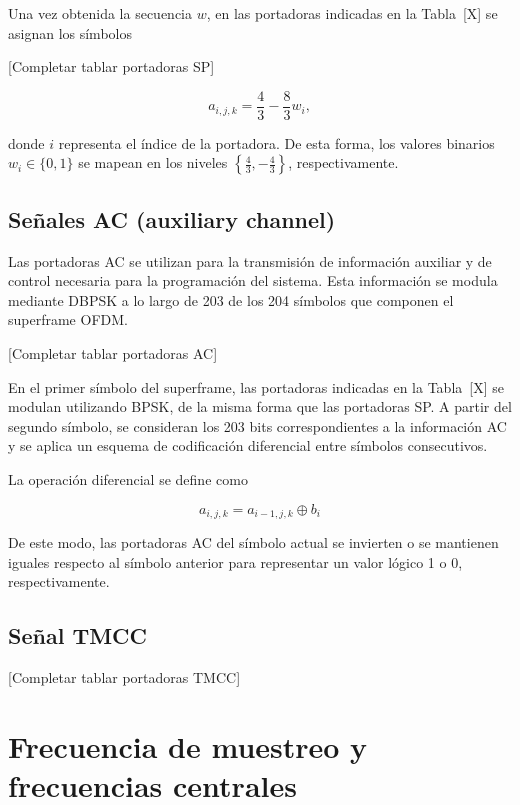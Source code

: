 	Una vez obtenida la secuencia $w$, en las portadoras indicadas en la Tabla~[X] se asignan los símbolos

	{\Huge[Completar tablar portadoras SP]}

	\begin{equation}
		a_{i,j,k} = \frac{4}{3} - \frac{8}{3} w_i,
	\end{equation}

	donde $i$ representa el índice de la portadora. De esta forma, los valores binarios $w_i \in \{0,1\}$ se mapean en los niveles $\left\{ \frac{4}{3}, -\frac{4}{3} \right\}$, respectivamente.


	\subsection{Señales AC (auxiliary channel)}
	Las portadoras AC se utilizan para la transmisión de información auxiliar y de control necesaria para la programación del sistema. Esta información se modula mediante DBPSK a lo largo de 203 de los 204 símbolos que componen el superframe OFDM.

	{\Huge[Completar tablar portadoras AC]}


	En el primer símbolo del superframe, las portadoras indicadas en la Tabla~[X] se modulan utilizando BPSK, de la misma forma que las portadoras SP. A partir del segundo símbolo, se consideran los 203 bits correspondientes a la información AC y se aplica un esquema de codificación diferencial entre símbolos consecutivos.

	La operación diferencial se define como

	\begin{equation}
		a_{i,j,k} = a_{i-1,j,k} \oplus b_i
	\end{equation}

	De este modo, las portadoras AC del símbolo actual se invierten o se mantienen iguales respecto al símbolo anterior para representar un valor lógico 1 o 0, respectivamente.


	\subsection{Señal TMCC}
	{\Huge[Completar tablar portadoras TMCC]}
	\section{Frecuencia de muestreo y frecuencias centrales}

